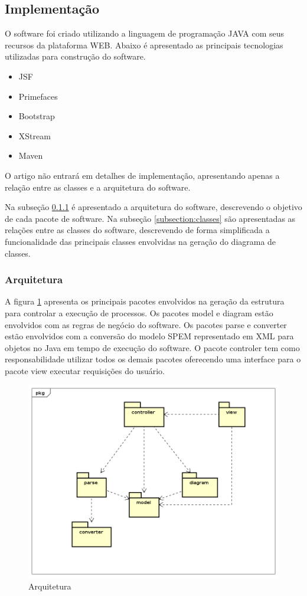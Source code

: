 \subsection{Implementação}\label{ferramentaImplementacao}
O software foi criado utilizando a linguagem de programação JAVA com seus recursos da plataforma WEB. Abaixo é apresentado as principais tecnologias utilizadas para construção do software.
\begin{itemize}
	\item JSF
	\item Primefaces
	\item Bootstrap
	\item XStream
	\item Maven
\end{itemize}

O artigo não entrará em detalhes de implementação, apresentando apenas a relação entre as classes e a arquitetura do software.

Na subseção \ref{subsection:arquitetura} é apresentado a arquitetura do software, descrevendo o objetivo de cada pacote de software. Na subseção \ref{subsection:classes} são apresentadas as relações entre as classes do software, descrevendo de forma simplificada a funcionalidade das principais classes envolvidas na geração do diagrama de classes.

\subsubsection{Arquitetura}\label{subsection:arquitetura}
A figura \ref{figura:figuraArquitetura} apresenta os principais pacotes envolvidos na geração da estrutura para controlar a execução de processos. Os pacotes model e diagram estão envolvidos com as regras de negócio do software. Os pacotes parse e converter estão envolvidos com a conversão do modelo SPEM representado em XML para objetos no Java em tempo de execução do software.
O pacote controler tem como responsabilidade utilizar todos os demais pacotes oferecendo uma interface para o pacote view executar requisições do usuário. 
\begin{figure}[!htb]
	\caption{Arquitetura}
	\label{figura:figuraArquitetura}
	\centering
	\includegraphics[width=1\textwidth]{img/ferramenta_arquitetura.png}
\end{figure}

